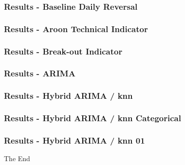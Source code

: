 \documentclass{beamer}
\begin{document}
\begin{frame}
\frametitle{Results - Baseline Daily Reversal}



\end{frame}

\begin{frame}
\frametitle{Results - Aroon Technical Indicator}



\end{frame}

\begin{frame}
\frametitle{Results - Break-out Indicator}



\end{frame}

\begin{frame}
\frametitle{Results - ARIMA}



\end{frame}

\begin{frame}
\frametitle{Results - Hybrid ARIMA / knn}



\end{frame}

\begin{frame}
\frametitle{Results - Hybrid ARIMA / knn Categorical}



\end{frame}

\begin{frame}
\frametitle{Results - Hybrid ARIMA / knn 01}



\end{frame}


\begin{frame}
\Huge{\centerline{The End}}
\end{frame}

\end{document}
